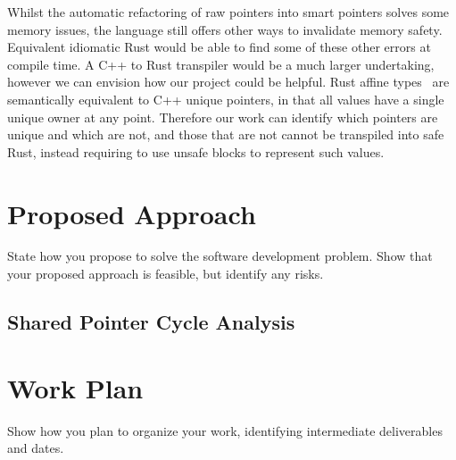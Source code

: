 \documentclass{proposal}
\begin{document}
    Whilst the automatic refactoring of raw pointers into smart pointers solves some memory issues, the language still offers other ways to invalidate memory safety.
    Equivalent idiomatic Rust would be able to find some of these other errors at compile time.
    A C++ to Rust transpiler would be a much larger undertaking, however we can envision how our project could be helpful.
    Rust affine types~\cite{Balasubramanian2017} are semantically equivalent to C++ unique pointers, in that all values have a single unique owner at any point.
    Therefore our work can identify which pointers are unique and which are not, and those that are not cannot be transpiled into safe Rust, instead requiring to use unsafe blocks to represent such values.




    \section{Proposed Approach}\label{sec:proposed-approach}

    State how you propose to solve the software development problem.
    Show that your proposed approach is feasible, but identify any risks.

    \subsection{Shared Pointer Cycle Analysis}\label{subsec:shared-pointer-cycle-analysis}



    \section{Work Plan}\label{sec:work-plan}

    Show how you plan to organize your work, identifying intermediate deliverables and dates.




    
    
\end{document}
